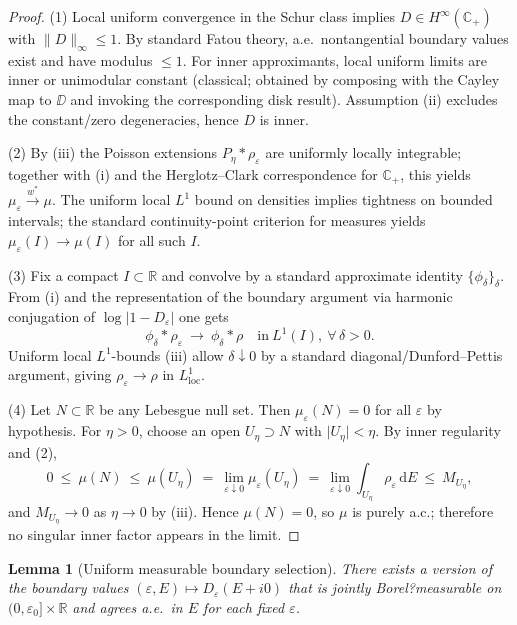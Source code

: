 ﻿\documentclass[12pt,a4paper]{article}
\newtheorem{lemma}[theorem]{Lemma}
\theoremstyle{definition}
\theoremstyle{remark}
\newcommand{\CC}{\mathbb{C}}
\newcommand{\RR}{\mathbb{R}}
\begin{document}
\begin{proof}
(1) Local uniform convergence in the Schur class implies $D\in H^\infty(\CC_+)$ with $\lVert D\rVert_\infty\le 1$. By standard Fatou theory, a.e.\ nontangential boundary values exist and have modulus $\le 1$. For inner approximants, local uniform limits are inner or unimodular constant (classical; obtained by composing with the Cayley map to $\DD$ and invoking the corresponding disk result). Assumption (ii) excludes the constant/zero degeneracies, hence $D$ is inner.

(2) By (iii) the Poisson extensions $P_\eta\!\ast\!\rho_\varepsilon$ are uniformly locally integrable; together with (i) and the Herglotz--Clark correspondence for $\CC_+$, this yields $\mu_\varepsilon \stackrel{w^*}{\to} \mu$. The uniform local $L^1$ bound on densities implies tightness on bounded intervals; the standard continuity-point criterion for measures yields $\mu_\varepsilon(I)\to\mu(I)$ for all such $I$.

(3) Fix a compact $I\subset\RR$ and convolve by a standard approximate identity $\{\phi_\delta\}_\delta$. From (i) and the representation of the boundary argument via harmonic conjugation of $\log\lvert 1-D_\varepsilon\rvert$ one gets
\[
\phi_\delta\ast \rho_\varepsilon \ \longrightarrow\ \phi_\delta\ast \rho
\quad\text{in}\ L^1(I),\ \forall\,\delta>0.
\]
Uniform local $L^1$-bounds (iii) allow $\delta\downarrow0$ by a standard diagonal/Dunford--Pettis argument, giving $\rho_\varepsilon\to\rho$ in $L^1_{\mathrm{loc}}$.

(4) Let $N\subset\RR$ be any Lebesgue null set. Then $\mu_\varepsilon(N)=0$ for all $\varepsilon$ by hypothesis. For $\eta>0$, choose an open $U_\eta\supset N$ with $\lvert U_\eta\rvert<\eta$. By inner regularity and (2),
\[
0\ \le\ \mu(N)\ \le\ \mu(U_\eta)\ =\ \lim_{\varepsilon\downarrow0}\mu_\varepsilon(U_\eta)\ =\ \lim_{\varepsilon\downarrow0}\int_{U_\eta}\rho_\varepsilon\,\mathrm dE\ \le\ M_{U_\eta},
\]
and $M_{U_\eta}\to 0$ as $\eta\to0$ by (iii). Hence $\mu(N)=0$, so $\mu$ is purely a.c.; therefore no singular inner factor appears in the limit.
\end{proof}

\begin{lemma}[Uniform measurable boundary selection]
\label{lem:A3-measurable-selection}
There exists a version of the boundary values $(\varepsilon,E)\mapsto D_\varepsilon(E+i0)$ that is jointly Borel?measurable on $(0,\varepsilon_0]\times\RR$ and agrees a.e.\ in $E$ for each fixed $\varepsilon$. 
\end{lemma}
\end{document}
